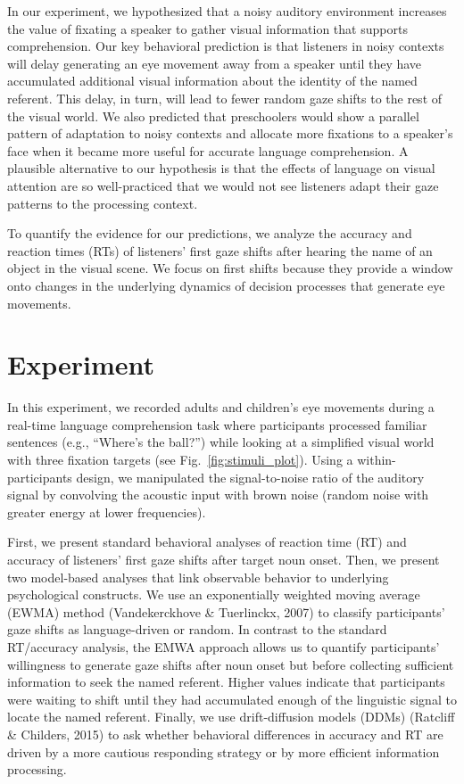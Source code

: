 \documentclass[10pt, letterpaper]{article}
\begin{document}
In our experiment, we hypothesized that a noisy auditory environment
increases the value of fixating a speaker to gather visual information
that supports comprehension. Our key behavioral prediction is that
listeners in noisy contexts will delay generating an eye movement away
from a speaker until they have accumulated additional visual information
about the identity of the named referent. This delay, in turn, will lead
to fewer random gaze shifts to the rest of the visual world. We also
predicted that preschoolers would show a parallel pattern of adaptation
to noisy contexts and allocate more fixations to a speaker's face when
it became more useful for accurate language comprehension. A plausible
alternative to our hypothesis is that the effects of language on visual
attention are so well-practiced that we would not see listeners adapt
their gaze patterns to the processing context.

To quantify the evidence for our predictions, we analyze the accuracy
and reaction times (RTs) of listeners' first gaze shifts after hearing
the name of an object in the visual scene. We focus on first shifts
because they provide a window onto changes in the underlying dynamics of
decision processes that generate eye movements.

\section{Experiment}\label{experiment}

In this experiment, we recorded adults and children's eye movements
during a real-time language comprehension task where participants
processed familiar sentences (e.g., ``Where's the ball?'') while looking
at a simplified visual world with three fixation targets (see
Fig.~\ref{fig:stimuli_plot}). Using a within-participants design, we
manipulated the signal-to-noise ratio of the auditory signal by
convolving the acoustic input with brown noise (random noise with
greater energy at lower frequencies).

First, we present standard behavioral analyses of reaction time (RT) and
accuracy of listeners' first gaze shifts after target noun onset. Then,
we present two model-based analyses that link observable behavior to
underlying psychological constructs. We use an exponentially weighted
moving average (EWMA) method (Vandekerckhove \& Tuerlinckx, 2007) to
classify participants' gaze shifts as language-driven or random. In
contrast to the standard RT/accuracy analysis, the EMWA approach allows
us to quantify participants' willingness to generate gaze shifts after
noun onset but before collecting sufficient information to seek the
named referent. Higher values indicate that participants were waiting to
shift until they had accumulated enough of the linguistic signal to
locate the named referent. Finally, we use drift-diffusion models (DDMs)
(Ratcliff \& Childers, 2015) to ask whether behavioral differences in
accuracy and RT are driven by a more cautious responding strategy or by
more efficient information processing.
\end{document}
